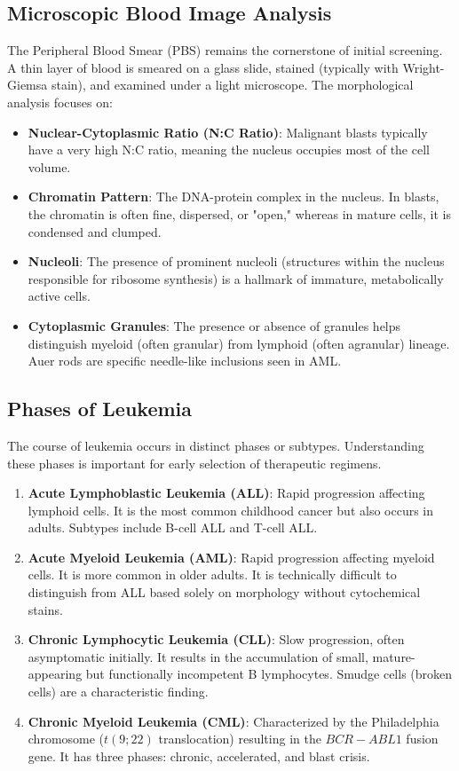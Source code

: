 \documentclass[twocolumn,10pt,a4paper]{article}
\begin{document}
\subsection{Microscopic Blood Image Analysis}
The Peripheral Blood Smear (PBS) remains the cornerstone of initial screening. A thin layer of blood is smeared on a glass slide, stained (typically with Wright-Giemsa stain), and examined under a light microscope. The morphological analysis focuses on:
\begin{itemize}
    \item \textbf{Nuclear-Cytoplasmic Ratio (N:C Ratio)}: Malignant blasts typically have a very high N:C ratio, meaning the nucleus occupies most of the cell volume.
    \item \textbf{Chromatin Pattern}: The DNA-protein complex in the nucleus. In blasts, the chromatin is often fine, dispersed, or "open," whereas in mature cells, it is condensed and clumped.
    \item \textbf{Nucleoli}: The presence of prominent nucleoli (structures within the nucleus responsible for ribosome synthesis) is a hallmark of immature, metabolically active cells.
    \item \textbf{Cytoplasmic Granules}: The presence or absence of granules helps distinguish myeloid (often granular) from lymphoid (often agranular) lineage. Auer rods are specific needle-like inclusions seen in AML.
\end{itemize}

\subsection{Phases of Leukemia}
The course of leukemia occurs in distinct phases or subtypes. Understanding these phases is important for early selection of therapeutic regimens.
\begin{enumerate}
    \item \textbf{Acute Lymphoblastic Leukemia (ALL)}: Rapid progression affecting lymphoid cells. It is the most common childhood cancer but also occurs in adults. Subtypes include B-cell ALL and T-cell ALL.
    \item \textbf{Acute Myeloid Leukemia (AML)}: Rapid progression affecting myeloid cells. It is more common in older adults. It is technically difficult to distinguish from ALL based solely on morphology without cytochemical stains.
    \item \textbf{Chronic Lymphocytic Leukemia (CLL)}: Slow progression, often asymptomatic initially. It results in the accumulation of small, mature-appearing but functionally incompetent B lymphocytes. Smudge cells (broken cells) are a characteristic finding.
    \item \textbf{Chronic Myeloid Leukemia (CML)}: Characterized by the Philadelphia chromosome ($t(9;22)$ translocation) resulting in the $BCR-ABL1$ fusion gene. It has three phases: chronic, accelerated, and blast crisis.
\end{enumerate}
\end{document}

